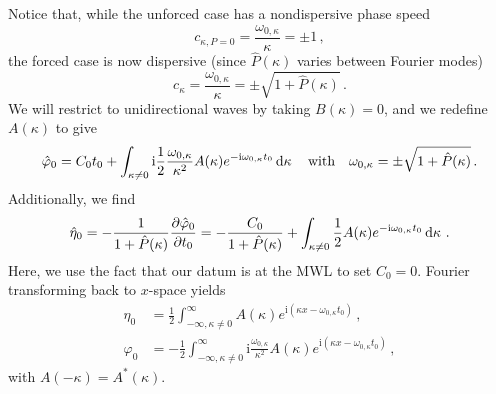\documentclass{jfm}
\newcommand{\GenPk}{\hat{P}(\kappa)}
\newcommand{\im}{\mathrm{i}}
\begin{document}
Notice that, while the unforced case has a nondispersive phase speed
\[
  c_{\kappa, P=0} = \frac{\omega_{0,\kappa}}{\kappa} = \pm 1 \,,
\]
the forced case is now dispersive (since $\GenPk$ varies between Fourier
modes)
\[
  c_{\kappa} = \frac{\omega_{0,\kappa}}{\kappa} = \pm \sqrt{1 + \GenPk}
  \,.
\]
We will restrict to unidirectional waves by taking $B(\kappa) = 0$, and
we redefine $A(\kappa)$ to give
\begin{equation}
  \hat{\varphi}_0 = C_0 t_0 + \int_{\kappa \neq 0} \im
    \frac{1}{2} \frac{\omega_{0,\kappa}}{\kappa^2} A(\kappa) e^{-\im
    \omega_{0,\kappa} t_0} \dd{\kappa}
  \qq{with} \omega_{0,\kappa} = \pm \sqrt{1+\GenPk} \,.
\end{equation}
Additionally, we find
\begin{equation}
  \hat{\eta}_0 = - \frac{1}{1+\GenPk} \pdv{\hat{\varphi}_0}{t_0} =
    -\frac{C_0}{1+\GenPk} +
    \int_{\kappa \neq 0} \frac{1}{2} A(\kappa) e^{-\im \omega_{0,\kappa}
    t_0} \dd{\kappa}
    \,.
\end{equation}
Here, we use the fact that our datum is at the MWL to set $C_0 = 0$.
Fourier transforming back to $x$-space yields
\begin{align}
  \eta_0 &= \frac{1}{2} \int_{-\infty,\kappa \neq 0}^{\infty} A(\kappa)
    e^{\im (\kappa x-\omega_{0,\kappa} t_0)} \,, \label{eq:eta0_sol_int2}
    \\
  \varphi_0 &= -\frac{1}{2} \int_{-\infty,\kappa \neq 0}^{\infty} \im
    \frac{\omega_{0,\kappa}}{\kappa^2} A(\kappa)
    e^{\im (\kappa x-\omega_{0,\kappa} t_0)} \label{eq:phi0_sol_int2} \,,
\end{align}
with $A(-\kappa) = A^*(\kappa)$.
\end{document}
